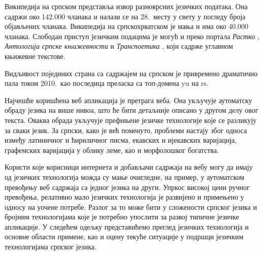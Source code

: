 \begin{multicols}{2}
Википедија на српском представља извор разноврсних језичких података. Она садржи око 142.000 чланака и налази се на  28.~месту \cite{WIKI} у свету у погледу броја објављених чланака. Википедија на српскохрватском \cite{SHWIKI}   је мања и  има око 40.000 чланака. Слободан приступ језичким подацима је могућ и преко портала \textit{Растко} \cite{RASTKO},  \textit{Антологија српске књижевности} \cite{ASK} и \textit{Транспоетика} \cite{TRPOET}, који садрже углавном књижевне текстове.
 
Видљивост појединих страна са садржајем на српском је привремено драматично пала током 2010.~као последица преласка са топ-домена yu на rs. 

Најчешће коришћена веб апликација је претрага веба. Она укључује аутоматску обраду језика на више нивоа, што ће бити детаљније описано у другом делу овог текста.  Оваква обрада укључује префињене језичке технологије које се разликују за сваки језик.  За српски, како је већ поменуто,  проблеми настају због односа између латиничног и ћириличног писма,  екавских и ијекавских варијација, графемских варијација у облику леме, као и морфолошког богатства. 

Користи које корисници интернета и добављачи садржаја на вебу могу да имају од језичких технологија можда су мање очигледне, на пример, у аутоматском превођењу веб садржаја са једног језика на други. Упркос високој цени ручног превођења, релативно мало језичких технологија је развијено и примењено у односу на уочене потребе.  Разлог за то може бити у сложености српског језика и бројним технологијама које је потребно упослити за развој типичне језичке апликације. У следећем одељку представићемо преглед језичких технологија и основне области примене,  као и оцену текуће ситуације у подршци језичким технологијама српског језика.
\end{multicols}

\clearpage

